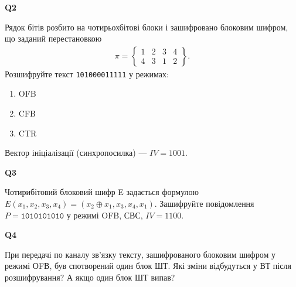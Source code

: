 \documentclass{../../test-template}
\begin{document}
\begin{tcolorbox}[lowerbox=invisible,colback=white]
    \begin{minipage}{0.1\textwidth}
        \raggedright
        \vspace*{\fill}
            \textbf{Q2}
        \vspace*{\fill}
        \end{minipage}
        \begin{minipage}{0.75\textwidth}
        Рядок бітів розбито на чотирьохбітові блоки і зашифровано блоковим
шифром, що заданий перестановкою 
\begin{align*}
    \pi=\left\{\begin{array}{сссс}
    1 & 2 & 3 & 4  \\
     4 & 3 & 1 & 2 
\end{array}\right\}.
\end{align*}
Розшифруйте текст \texttt{101000011111} у режимах:
\begin{enumerate}
    \item OFB
    \item CFB
    \item CTR
\end{enumerate}
Вектор ініціалізації (синхропосилка) --- $IV=1001$.
        \end{minipage}
\end{tcolorbox}

\begin{tcolorbox}[lowerbox=invisible,colback=white]
    \begin{minipage}{0.1\textwidth}
        \raggedright
        \vspace*{\fill}
            \textbf{Q3}
        \vspace*{\fill}
        \end{minipage}
        \begin{minipage}{0.75\textwidth}
       Чотирибітовий блоковий шифр E задається формулою
$E(x_1, x_2, x_3, x_4) = (x_2 \oplus x_1, x_3, x_4, x_1)$.
Зашифруйте повідомлення $P = \texttt{1010101010}$ у режимі OFB, СВС, $IV = 1100$.
        \end{minipage}
\end{tcolorbox}
\begin{tcolorbox}[lowerbox=invisible,colback=white]
    \begin{minipage}{0.1\textwidth}
        \raggedright
        \vspace*{\fill}
            \textbf{Q4}
        \vspace*{\fill}
        \end{minipage}
        \begin{minipage}{0.75\textwidth}
       При передачі по каналу зв’язку тексту, зашифрованого блоковим шифром у
режимі ОFВ, був спотворений один блок ШТ. Які зміни відбудуться у ВТ
після розшифрування? А якщо один блок ШТ випав?
        \end{minipage}
\end{tcolorbox}
\end{document}
